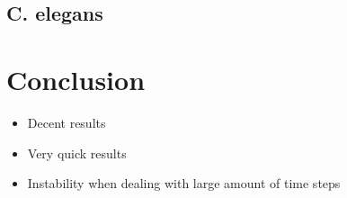 \documentclass[14pt]{beamer}
\begin{document}
\subsection{C. elegans}

\begin{frame}{\insertsection}{\insertsubsection}
  \begin{center}
    
  \end{center}
\end{frame}

\begin{frame}{\insertsection}{\insertsubsection}
  \begin{center}
    
  \end{center}
\end{frame}

\section{Conclusion}

\begin{frame}{\insertsection}
  \begin{itemize}
    \item Decent results
    \item Very quick results
    \item Instability when dealing with large amount of time steps
  \end{itemize}
\end{frame}
\end{document}
